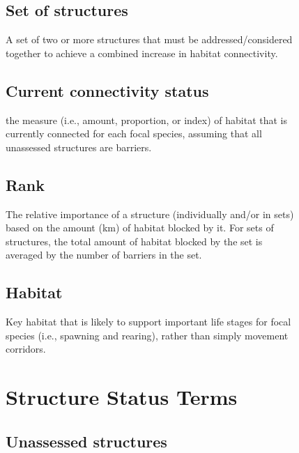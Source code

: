 \documentclass[
  letterpaper,
  DIV=11,
  numbers=noendperiod]{scrreprt}
\begin{document}
\begin{figure}
{\subsection*{Set of structures}\label{set-of-structures}

A set of two or more structures that must be addressed/considered
together to achieve a combined increase in habitat connectivity.

\subsection*{Current connectivity
status}\label{current-connectivity-status}

the measure (i.e., amount, proportion, or index) of habitat that is
currently connected for each focal species, assuming that all unassessed
structures are barriers.~

\subsection*{Rank}\label{rank}

The relative importance of a structure (individually and/or in sets)
based on the amount (km) of habitat blocked by it. For sets of
structures, the total amount of habitat blocked by the set is averaged
by the number of barriers in the set.

\subsection*{Habitat}\label{habitat}

Key habitat that is likely to support important life stages for focal
species (i.e., spawning and rearing), rather than simply movement
corridors.

\section*{Structure Status Terms}\label{structure-status-terms}


\subsection*{Unassessed structures}\label{unassessed-structures}

}
\end{figure}
\end{document}
